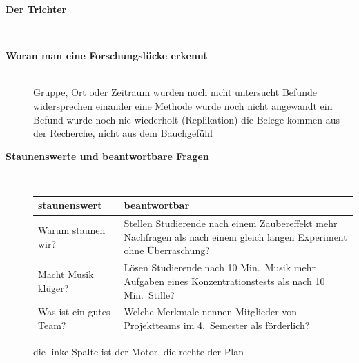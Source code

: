 \begin{description}
\item[{\rot\bf Der Trichter}]~\\[-\lblskip]
\begin{center}
\end{center}
\os{\newpage}

\item[{\rot\bf Woran man eine Forschungslücke erkennt}]~\\[-\lblskip]
\bi
  \ite Gruppe, Ort oder Zeitraum wurden noch nicht untersucht
  \ite Befunde widersprechen einander
  \ite eine Methode wurde noch nicht angewandt
  \ite ein Befund wurde noch nie wiederholt (Replikation)
  \ite die Belege kommen aus der Recherche, nicht aus dem Bauchgefühl
\ei
\os{\newpage}

\item[{\rot\bf Staunenswerte und beantwortbare Fragen}]~\\[-\lblskip]
\begin{center}
\small
\begin{tabular}{p{}p{}}
\toprule
\textbf{staunenswert} & \textbf{beantwortbar} \\
\midrule
Warum staunen wir? & Stellen Studierende nach einem Zaubereffekt mehr
  Nachfragen als nach einem gleich langen Experiment ohne Überraschung? \\
Macht Musik klüger? & Lösen Studierende nach 10 Min.\ Musik mehr
  Aufgaben eines Konzentrationstests als nach 10 Min.\ Stille? \\
Was ist ein gutes Team? & Welche Merkmale nennen Mitglieder von
  Projektteams im 4.~Semester als förderlich? \\
\bottomrule
\end{tabular}
\end{center}
\bi
  \ite die linke Spalte ist der Motor, die rechte der Plan
\ei
\os{\newpage}
\end{description}

